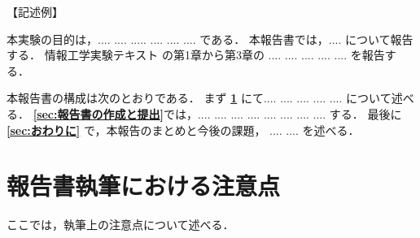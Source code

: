 \documentclass{jarticle}[11pt]
\begin{document}
\noindent
【記述例】

本実験の目的は，.... .... ..... .... .... .... である．
本報告書では，.... について報告する．
情報工学実験テキスト \cite{bib:実験テキスト} の第1章から第3章の
.... .... .... .... .... を報告する．

本報告書の構成は次のとおりである．
まず 
{\bf \ref{sec:報告書執筆における注意点}} にて.... .... .... .... .... 
について述べる．
{\bf \ref{sec:報告書の作成と提出}}では，.... .... .... .... .... .... 
.... .... する．
最後に {\bf \ref{sec:おわりに}} で，本報告のまとめと今後の課題，
.... .... を述べる．

\section{報告書執筆における注意点}
\label{sec:報告書執筆における注意点}

ここでは，執筆上の注意点について述べる．
\end{document}
